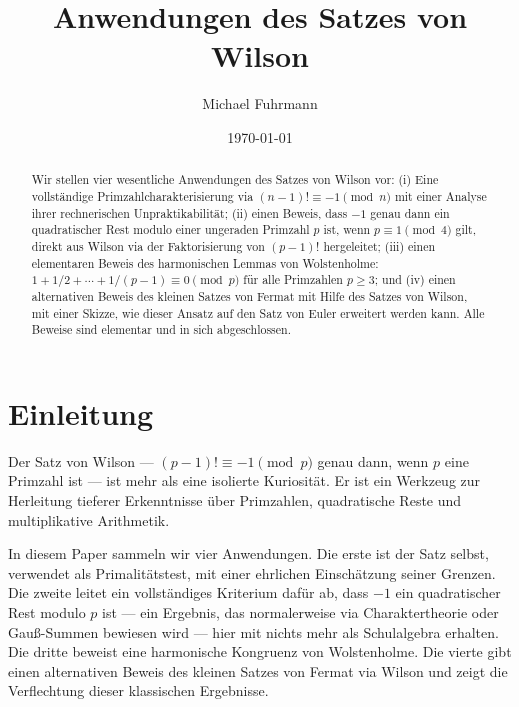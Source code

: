 \documentclass[12pt,a4paper]{amsart}
\theoremstyle{definition}
\begin{document}

\title{Anwendungen des Satzes von Wilson}

\author{Michael Fuhrmann}
\address{Specialist-Mathematics-Projekt, Build 66}
\date{\today}

\begin{abstract}
Wir stellen vier wesentliche Anwendungen des Satzes von Wilson vor:
(i) Eine vollständige Primzahlcharakterisierung via $(n-1)! \equiv -1 \pmod{n}$
mit einer Analyse ihrer rechnerischen Unpraktikabilität;
(ii) einen Beweis, dass $-1$ genau dann ein quadratischer Rest modulo einer
ungeraden Primzahl $p$ ist, wenn $p \equiv 1 \pmod{4}$ gilt, direkt aus Wilson
via der Faktorisierung von $(p-1)!$ hergeleitet;
(iii) einen elementaren Beweis des harmonischen Lemmas von Wolstenholme:
$1 + 1/2 + \cdots + 1/(p-1) \equiv 0 \pmod{p}$ für alle Primzahlen $p \geq 3$;
und (iv) einen alternativen Beweis des kleinen Satzes von Fermat mit Hilfe
des Satzes von Wilson, mit einer Skizze, wie dieser Ansatz auf den Satz von
Euler erweitert werden kann.
Alle Beweise sind elementar und in sich abgeschlossen.
\end{abstract}

\maketitle
\tableofcontents

\section{Einleitung}

Der Satz von Wilson — $(p-1)! \equiv -1 \pmod{p}$ genau dann, wenn $p$
eine Primzahl ist — ist mehr als eine isolierte Kuriosität. Er ist ein
Werkzeug zur Herleitung tieferer Erkenntnisse über Primzahlen, quadratische
Reste und multiplikative Arithmetik.

In diesem Paper sammeln wir vier Anwendungen. Die erste ist der Satz selbst,
verwendet als Primalitätstest, mit einer ehrlichen Einschätzung seiner
Grenzen. Die zweite leitet ein vollständiges Kriterium dafür ab, dass $-1$
ein quadratischer Rest modulo $p$ ist — ein Ergebnis, das normalerweise via
Charaktertheorie oder Gauß-Summen bewiesen wird — hier mit nichts mehr als
Schulalgebra erhalten. Die dritte beweist eine harmonische Kongruenz von
Wolstenholme. Die vierte gibt einen alternativen Beweis des kleinen Satzes
von Fermat via Wilson und zeigt die Verflechtung dieser klassischen Ergebnisse.
\end{document}
